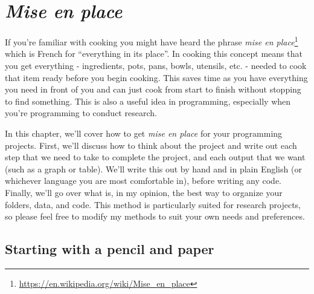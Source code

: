 \documentclass[
]{krantz}
\renewcommand{\href}[2]{#2\footnote{\url{#1}}}
\begin{document}
\hypertarget{mise-en-place}{%
\chapter{\texorpdfstring{\emph{Mise en place}}{Mise en place}}\label{mise-en-place}}

If you're familiar with cooking you might have heard the phrase \href{https://en.wikipedia.org/wiki/Mise_en_place}{\emph{mise en place}} which is French for ``everything in its place''. In cooking this concept means that you get everything - ingredients, pots, pans, bowls, utensils, etc. - needed to cook that item ready before you begin cooking. This saves time as you have everything you need in front of you and can just cook from start to finish without stopping to find something. This is also a useful idea in programming, especially when you're programming to conduct research.

In this chapter, we'll cover how to get \emph{mise en place} for your programming projects. First, we'll discuss how to think about the project and write out each step that we need to take to complete the project, and each output that we want (such as a graph or table). We'll write this out by hand and in plain English (or whichever language you are most comfortable in), before writing any code. Finally, we'll go over what is, in my opinion, the best way to organize your folders, data, and code. This method is particularly suited for research projects, so please feel free to modify my methods to suit your own needs and preferences.

\hypertarget{starting-with-a-pencil-and-paper}{%
\section{Starting with a pencil and paper}\label{starting-with-a-pencil-and-paper}}
\end{document}
